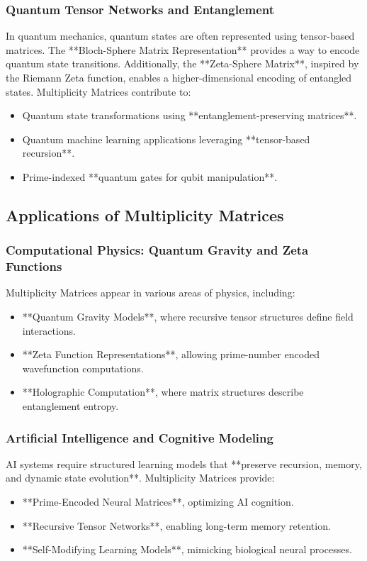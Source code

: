\documentclass{article}
\theoremstyle{plain}
\begin{document}
\subsubsection{Quantum Tensor Networks and Entanglement}
In quantum mechanics, quantum states are often represented using tensor-based matrices. The **Bloch-Sphere Matrix Representation** provides a way to encode quantum state transitions. Additionally, the **Zeta-Sphere Matrix**, inspired by the Riemann Zeta function, enables a higher-dimensional encoding of entangled states. Multiplicity Matrices contribute to:
\begin{itemize}
    \item Quantum state transformations using **entanglement-preserving matrices**.
    \item Quantum machine learning applications leveraging **tensor-based recursion**.
    \item Prime-indexed **quantum gates for qubit manipulation**.
\end{itemize}

\subsection{Applications of Multiplicity Matrices}

\subsubsection{Computational Physics: Quantum Gravity and Zeta Functions}
Multiplicity Matrices appear in various areas of physics, including:
\begin{itemize}
    \item **Quantum Gravity Models**, where recursive tensor structures define field interactions.
    \item **Zeta Function Representations**, allowing prime-number encoded wavefunction computations.
    \item **Holographic Computation**, where matrix structures describe entanglement entropy.
\end{itemize}

\subsubsection{Artificial Intelligence and Cognitive Modeling}
AI systems require structured learning models that **preserve recursion, memory, and dynamic state evolution**. Multiplicity Matrices provide:
\begin{itemize}
    \item **Prime-Encoded Neural Matrices**, optimizing AI cognition.
    \item **Recursive Tensor Networks**, enabling long-term memory retention.
    \item **Self-Modifying Learning Models**, mimicking biological neural processes.
\end{itemize}
\end{document}
